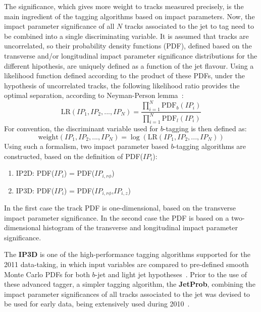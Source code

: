 The significance, which gives more weight to tracks measured precisely, is the main ingredient of the tagging algorithms based on impact parameters. Now, the impact parameter significance of all $N$ tracks associated to the jet to tag need to be combined into a single discriminating variable. It is assumed that tracks are uncorrelated, so their probability density functions (PDF), defined based on the transverse and/or longitudinal impact parameter significance distributions for the different hipothesis, are uniquely  defined as a function of the jet flavour. Using a likelihood function defined according to the product of these PDFs, under the hypothesis of uncorrelated tracks, the following likelihood ratio provides the optimal separation, according to Neyman-Person lemma~\cite{1933RSPTA.231..289N}:
%
\begin{equation}
\mbox{LR}(IP_1,IP_2,...,IP_N) = \frac{\prod_{i=1}^N \mbox{PDF}_b(IP_i)}{\prod_{i=1}^N \mbox{PDF}_l(IP_i)}
\end{equation}
%
For convention, the discriminant variable used for $b$-tagging is then defined as:
%
\begin{equation}
\mbox{weight}(IP_1,IP_2,...,IP_N) = \log(\mbox{LR}(IP_1,IP_2,...,IP_N))
\end{equation}
%
Using such a formalism, two impact parameter based $b$-tagging algorithms are constructed, based on the definition of PDF($IP_i$):

\begin{enumerate}\addtolength{\itemsep}{-0.4\baselineskip}
\item
IP2D: PDF($IP_i$) = PDF($IP_{i,r\phi}$)
\item
IP3D:  PDF($IP_i$) = PDF($IP_{i,r\phi}$,$IP_{i,z}$)
\end{enumerate}

In the first case the track PDF is one-dimensional, based on the transverse impact parameter significance. In the second case the PDF is based on a two-dimensional histogram of the transverse and longitudinal impact parameter significance. 

The \textbf{IP3D} is one of the high-performance tagging algorithms supported for the 2011 data-taking, in which input variables are compared to pre-defined smooth Monte Carlo PDFs for both $b$-jet and light jet hypotheses~\cite{ATLAS-CONF-2011-102}.  Prior to the use of these advanced tagger, a simpler tagging algorithm, the \textbf{JetProb}, combining the impact parameter significances of all tracks associated to the jet was devised to be used for early data, being extensively used during 2010~\cite{ATLAS-CONF-2010-091}. 


